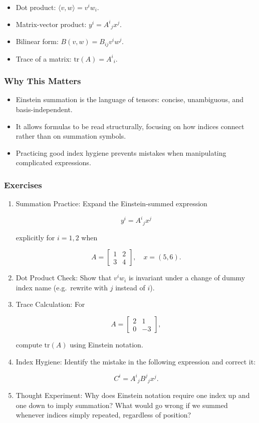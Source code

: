 \documentclass[
  letterpaper,
  DIV=11,
  numbers=noendperiod]{scrreprt}
\providecommand{\tightlist}{%
  \setlength{\itemsep}{0pt}\setlength{\parskip}{0pt}}
\begin{document}
\begin{itemize}
\tightlist
\item
  Dot product: \(\langle v,w \rangle = v^i w_i\).
\item
  Matrix-vector product: \(y^i = A^i{}_j x^j\).
\item
  Bilinear form: \(B(v,w) = B_{ij} v^i w^j\).
\item
  Trace of a matrix: \(\mathrm{tr}(A) = A^i{}_i\).
\end{itemize}

\subsubsection{Why This Matters}\label{why-this-matters-3}

\begin{itemize}
\tightlist
\item
  Einstein summation is the language of tensors: concise, unambiguous,
  and basis-independent.
\item
  It allows formulas to be read structurally, focusing on how indices
  connect rather than on summation symbols.
\item
  Practicing good index hygiene prevents mistakes when manipulating
  complicated expressions.
\end{itemize}

\subsubsection{Exercises}\label{exercises-11}

\begin{enumerate}
\def\labelenumi{\arabic{enumi}.}
\item
  Summation Practice: Expand the Einstein-summed expression

  \[
  y^i = A^i{}_j x^j
  \]

  explicitly for \(i=1,2\) when

  \[
  A = \begin{bmatrix}1 & 2 \\ 3 & 4\end{bmatrix}, \quad x=(5,6).
  \]
\item
  Dot Product Check: Show that \(v^i w_i\) is invariant under a change
  of dummy index name (e.g.~rewrite with \(j\) instead of \(i\)).
\item
  Trace Calculation: For

  \[
  A = \begin{bmatrix}2 & 1 \\ 0 & -3\end{bmatrix},
  \]

  compute \(\mathrm{tr}(A)\) using Einstein notation.
\item
  Index Hygiene: Identify the mistake in the following expression and
  correct it:

  \[
  C^i = A^i{}_j B^j{}_j x^j.
  \]
\item
  Thought Experiment: Why does Einstein notation require one index up
  and one down to imply summation? What would go wrong if we summed
  whenever indices simply repeated, regardless of position?
\end{enumerate}
\end{document}
